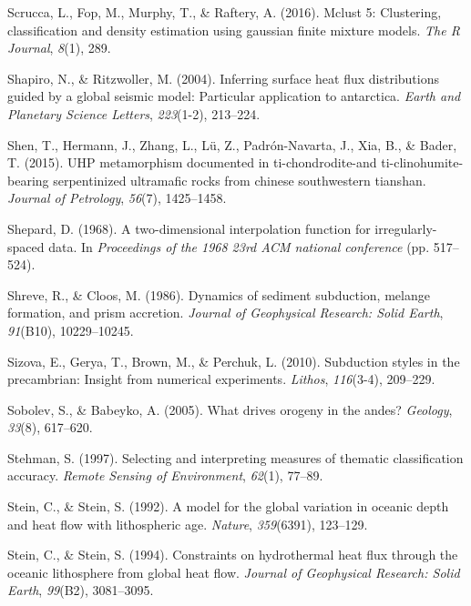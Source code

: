 \begin{CSLReferences}{1}{1}
\leavevmode{}%
Scrucca, L., Fop, M., Murphy, T., \& Raftery, A. (2016). Mclust 5: Clustering, classification and density estimation using gaussian finite mixture models. \emph{The R Journal}, \emph{8}(1), 289.

\leavevmode{}%
Shapiro, N., \& Ritzwoller, M. (2004). Inferring surface heat flux distributions guided by a global seismic model: Particular application to antarctica. \emph{Earth and Planetary Science Letters}, \emph{223}(1-2), 213--224.

\leavevmode{}%
Shen, T., Hermann, J., Zhang, L., Lü, Z., Padrón-Navarta, J., Xia, B., \& Bader, T. (2015). UHP metamorphism documented in ti-chondrodite-and ti-clinohumite-bearing serpentinized ultramafic rocks from chinese southwestern tianshan. \emph{Journal of Petrology}, \emph{56}(7), 1425--1458.

\leavevmode{}%
Shepard, D. (1968). A two-dimensional interpolation function for irregularly-spaced data. In \emph{Proceedings of the 1968 23rd ACM national conference} (pp. 517--524).

\leavevmode{}%
Shreve, R., \& Cloos, M. (1986). Dynamics of sediment subduction, melange formation, and prism accretion. \emph{Journal of Geophysical Research: Solid Earth}, \emph{91}(B10), 10229--10245.

\leavevmode{}%
Sizova, E., Gerya, T., Brown, M., \& Perchuk, L. (2010). Subduction styles in the precambrian: Insight from numerical experiments. \emph{Lithos}, \emph{116}(3-4), 209--229.

\leavevmode{}%
Sobolev, S., \& Babeyko, A. (2005). What drives orogeny in the andes? \emph{Geology}, \emph{33}(8), 617--620.

\leavevmode{}%
Stehman, S. (1997). Selecting and interpreting measures of thematic classification accuracy. \emph{Remote Sensing of Environment}, \emph{62}(1), 77--89.

\leavevmode{}%
Stein, C., \& Stein, S. (1992). A model for the global variation in oceanic depth and heat flow with lithospheric age. \emph{Nature}, \emph{359}(6391), 123--129.

\leavevmode{}%
Stein, C., \& Stein, S. (1994). Constraints on hydrothermal heat flux through the oceanic lithosphere from global heat flow. \emph{Journal of Geophysical Research: Solid Earth}, \emph{99}(B2), 3081--3095.


\end{CSLReferences}
